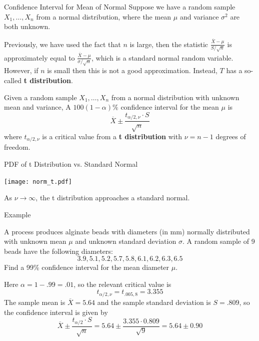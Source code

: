 \documentclass{beamer}
\renewcommand{\emph}{\textbf}
\begin{document}
\begin{frame}{Confidence Interval for Mean of Normal}
Suppose we have a random sample $X_1,\dots,X_n$ from a normal distribution, where the mean $\mu$ and variance $\sigma^2$ are both unknown. 

\pause \vspace{.2cm}Previously, we have used the fact that $n$ is large, then the statistic $\frac{\overline{X}-\mu}{S/\sqrt{n}}$ is approximately equal to $\frac{\overline{X}-\mu}{\sigma/\sqrt{n}}$, which is a standard normal random variable. However, if $n$ is small then this is not a good approximation. Instead, $T$ has a so-called \emph{t distribution}.

\pause \begin{block}{}
Given a random sample $X_1,\dots,X_n$ from a normal distribution with unknown mean and variance,
A $100(1-\alpha)\%$ confidence interval for the mean $\mu$ is
$$\overline{X} \pm \frac{t_{\alpha/2,\nu}\cdot S}{\sqrt{n}}$$
where $t_{\alpha/2,\nu}$ is a critical value from a \emph{t distribution} with $\nu=n-1$ degrees of freedom.
\end{block}
\end{frame}

\begin{frame}{PDF of t Distribution vs. Standard Normal}
\vspace{-1cm}
\begin{center}
\texttt{[image: norm\_t.pdf]}
\end{center}

\vspace{-1cm}
As $\nu\to\infty$, the t distribution approaches a standard normal.
\end{frame}

\begin{frame}{Example}
\begin{block}{}
A process produces alginate beads
with diameters (in mm) normally distributed with unknown mean $\mu$ and unknown standard deviation $\sigma$. A random sample of 9 beads have the following diameters:
$$3.9, 5.1, 5.2, 5.7, 5.8, 6.1, 6.2, 6.3, 6.5$$
Find a 99\% confidence interval for the mean diameter $\mu$.
\end{block}
\pause Here $\alpha=1-.99=.01$, so the relevant critical value is 
$$t_{\alpha/2,\nu}=t_{.005,8} = 3.355$$
\pause The sample mean is $\overline X=5.64$ and the sample standard deviation is $S=.809$, so the confidence interval is given by
$$\overline X \pm \frac{t_{\alpha/2} \cdot S}{\sqrt n} = 5.64 \pm \frac{3.355 \cdot 0.809}{\sqrt{9}} = 5.64 \pm  0.90$$
\end{frame}
\end{document}
